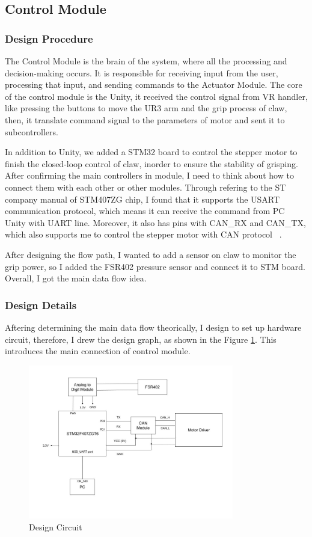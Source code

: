 \subsection{Control Module}
\subsubsection{Design Procedure}
The Control Module is the brain of the system, where all the processing and decision-making occurs. It is responsible for receiving input from the user, processing that input, and sending commands to the Actuator Module. The core of the control module is the Unity, it received the control signal from VR handler, like pressing the buttons to move the UR3 arm and the grip process of claw, then, it translate command signal to the parameters of motor and sent it to subcontrollers. 
  
In addition to Unity, we added a STM32 board to control the stepper motor to finish the closed-loop control of claw, inorder to ensure the stability of grisping. After confirming the main controllers in module, I need to think about how to connect them with each other or other modules. Through refering to the ST company manual of STM407ZG chip, I found that it supports the USART communication protocol, which means it can receive the command from PC Unity with UART line. Moreover, it also has pins with CAN\_RX and CAN\_TX, which also supports me to control the stepper motor with CAN protocol ~\cite{stm32f407zg}. 
  
After designing the flow path, I wanted to add a sensor on claw to monitor the grip power, so I added the FSR402 pressure sensor and connect it to STM board. Overall, I got the main data flow idea.
  
\subsubsection{Design Details}
Aftering determining the main data flow theorically, I design to set up hardware circuit, therefore, I drew the design graph, as shown in the Figure \ref{fig:design_circuit}. This introduces the main connection of control module.
\newpage
\begin{figure}[h]
    \centering
    \includegraphics[width=0.8\textwidth]{Figures/Design Circuit.jpg}
    \caption{Design Circuit}
    \label{fig:design_circuit}
\end{figure}
  
